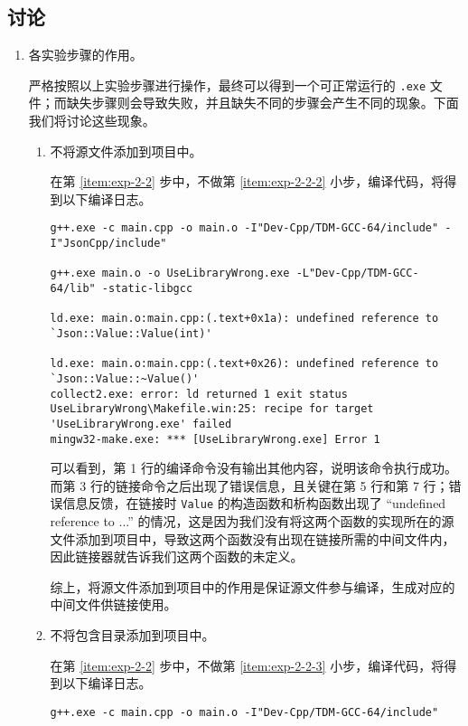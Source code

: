 \subsection*{讨论}

\begin{enumerate}
	\item 各实验步骤的作用。

	严格按照以上实验步骤进行操作，最终可以得到一个可正常运行的 \lstinline[language={}]{.exe} 文件；而缺失步骤则会导致失败，并且缺失不同的步骤会产生不同的现象。下面我们将讨论这些现象。

	\begin{enumerate}
		\item 不将源文件添加到项目中。

		在第 \ref{item:exp-2-2} 步中，不做第 \ref{item:exp-2-2-2} 小步，编译代码，将得到以下编译日志。

		\begin{lstlisting}[language={}]
g++.exe -c main.cpp -o main.o -I"Dev-Cpp/TDM-GCC-64/include" -I"JsonCpp/include"

g++.exe main.o -o UseLibraryWrong.exe -L"Dev-Cpp/TDM-GCC-64/lib" -static-libgcc

ld.exe: main.o:main.cpp:(.text+0x1a): undefined reference to `Json::Value::Value(int)'

ld.exe: main.o:main.cpp:(.text+0x26): undefined reference to `Json::Value::~Value()'
collect2.exe: error: ld returned 1 exit status
UseLibraryWrong\Makefile.win:25: recipe for target 'UseLibraryWrong.exe' failed
mingw32-make.exe: *** [UseLibraryWrong.exe] Error 1
		\end{lstlisting}

		可以看到，第 1 行的编译命令没有输出其他内容，说明该命令执行成功。而第 3 行的链接命令之后出现了错误信息，且关键在第 5 行和第 7 行；错误信息反馈，在链接时 \lstinline[language={[17]C++}, moreemph={[1]Value}]{Value} 的构造函数和析构函数出现了 “undefined reference to ...” 的情况，这是因为我们没有将这两个函数的实现所在的源文件添加到项目中，导致这两个函数没有出现在链接所需的中间文件内，因此链接器就告诉我们这两个函数的未定义。

		综上，将源文件添加到项目中的作用是保证源文件参与编译，生成对应的中间文件供链接使用。

		\item 不将包含目录添加到项目中。

		在第 \ref{item:exp-2-2} 步中，不做第 \ref{item:exp-2-2-3} 小步，编译代码，将得到以下编译日志。

		\begin{lstlisting}[language={}]
g++.exe -c main.cpp -o main.o -I"Dev-Cpp/TDM-GCC-64/include"


\end{lstlisting}
\end{enumerate}
\end{enumerate}
